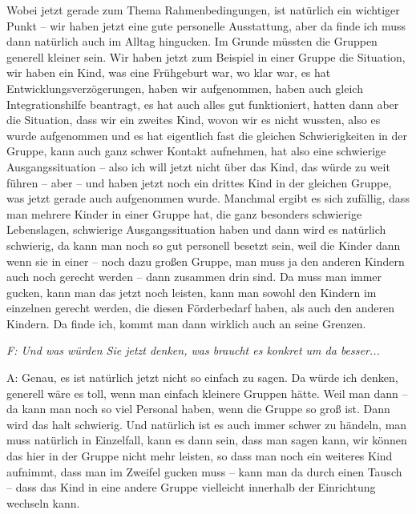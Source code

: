 \begin{linenumbers*}
Wobei jetzt gerade zum Thema Rahmenbedingungen, ist natürlich ein wichtiger Punkt – wir haben jetzt eine gute personelle Ausstattung, aber da finde ich muss dann natürlich auch im Alltag hingucken. Im Grunde müssten die Gruppen generell kleiner sein. Wir haben jetzt zum Beispiel in einer Gruppe die Situation, wir haben ein Kind, was eine Frühgeburt war, wo klar war, es hat Entwicklungsverzögerungen, haben wir aufgenommen, haben auch gleich Integrationshilfe beantragt, es hat auch alles gut funktioniert, hatten dann aber die Situation, dass wir ein zweites Kind, wovon wir es nicht wussten, also es wurde aufgenommen und es hat eigentlich fast die gleichen Schwierigkeiten in der Gruppe, kann auch ganz schwer Kontakt aufnehmen, hat also eine schwierige Ausgangssituation – also ich will jetzt nicht über das Kind, das würde zu weit führen -- aber -- und haben jetzt noch ein drittes Kind in der gleichen Gruppe, was jetzt gerade auch aufgenommen wurde. Manchmal ergibt es sich zufällig, dass man mehrere Kinder in einer Gruppe hat, die ganz besonders schwierige Lebenslagen, schwierige Ausgangssituation haben und dann wird es natürlich schwierig, da kann man noch so gut personell besetzt sein, weil die Kinder dann wenn sie in einer – noch dazu großen Gruppe, man muss ja den anderen Kindern auch noch gerecht werden – dann zusammen drin sind. Da muss man immer gucken, kann man das jetzt noch leisten, kann man sowohl den Kindern im einzelnen gerecht werden, die diesen Förderbedarf haben, als auch den anderen Kindern. Da finde ich, kommt man dann wirklich auch an seine Grenzen.

\emph{F: Und was würden Sie jetzt denken, was braucht es konkret um da besser...}

A: Genau, es ist natürlich jetzt nicht so einfach zu sagen. Da würde ich denken, generell wäre es toll, wenn man einfach kleinere Gruppen hätte. Weil man dann – da kann man noch so viel Personal haben, wenn die Gruppe so groß ist. Dann wird das halt schwierig. Und natürlich ist es auch immer schwer zu händeln, man muss natürlich in Einzelfall, kann es dann sein, dass man sagen kann, wir können das hier in der Gruppe nicht mehr leisten, so dass man noch ein weiteres Kind aufnimmt, dass man im Zweifel gucken muss – kann man da durch einen Tausch – dass das Kind in eine andere Gruppe vielleicht innerhalb der Einrichtung wechseln kann. 


\end{linenumbers*}
